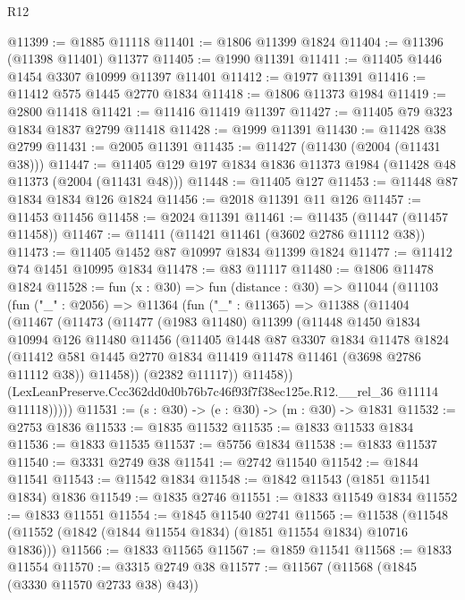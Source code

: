 \begin{lexlean}{R12}
\begin{coremodule}
@11399 := @1885 @11118
@11401 := @1806 @11399 @1824
@11404 := @11396 (@11398 @11401) @11377
@11405 := @1990 @11391
@11411 := @11405 @1446 @1454 @3307 @10999 @11397 @11401
@11412 := @1977 @11391
@11416 := @11412 @575 @1445 @2770 @1834
@11418 := @1806 @11373 @1984
@11419 := @2800 @11418
@11421 := @11416 @11419 @11397
@11427 := @11405 @79 @323 @1834 @1837 @2799 @11418
@11428 := @1999 @11391
@11430 := @11428 @38 @2799
@11431 := @2005 @11391
@11435 := @11427 (@11430 (@2004 (@11431 @38)))
@11447 := @11405 @129 @197 @1834 @1836 @11373 @1984 (@11428 @48 @11373 (@2004 (@11431 @48)))
@11448 := @11405 @127
@11453 := @11448 @87 @1834 @1834 @126 @1824
@11456 := @2018 @11391 @11 @126
@11457 := @11453 @11456
@11458 := @2024 @11391
@11461 := @11435 (@11447 (@11457 @11458))
@11467 := @11411 (@11421 @11461 (@3602 @2786 @11112 @38))
@11473 := @11405 @1452 @87 @10997 @1834 @11399 @1824
@11477 := @11412 @74 @1451 @10995 @1834
@11478 := @83 @11117
@11480 := @1806 @11478 @1824
@11528 := fun (x : @30) =>
  fun (distance : @30) =>
  @11044
    (@11103
      (fun ("_" : @2056) =>
      @11364
        (fun ("_" : @11365) =>
        @11388
          (@11404
            (@11467
              (@11473
                (@11477
                  (@1983 @11480)
                  @11399
                  (@11448
                    @1450
                    @1834
                    @10994
                    @126
                    @11480
                    @11456
                    (@11405
                      @1448
                      @87
                      @3307
                      @1834
                      @11478
                      @1824
                      (@11412 @581 @1445 @2770 @1834 @11419 @11478 @11461 (@3698 @2786 @11112 @38))
                      @11458))
                  (@2382 @11117))
                @11458))
            (LexLeanPreserve.Ccc362dd0d0b76b7c46f93f7f38ec125e.R12.__rel_36 @11114 @11118)))))
@11531 := (s : @30) -> (e : @30) -> (m : @30) -> @1831
@11532 := @2753 @1836
@11533 := @1835 @11532
@11535 := @1833 @11533 @1834
@11536 := @1833 @11535
@11537 := @5756 @1834
@11538 := @1833 @11537
@11540 := @3331 @2749 @38
@11541 := @2742 @11540
@11542 := @1844 @11541
@11543 := @11542 @1834
@11548 := @1842 @11543 (@1851 @11541 @1834) @1836
@11549 := @1835 @2746
@11551 := @1833 @11549 @1834
@11552 := @1833 @11551
@11554 := @1845 @11540 @2741
@11565 := @11538 (@11548 (@11552 (@1842 (@1844 @11554 @1834) (@1851 @11554 @1834) @10716 @1836)))
@11566 := @1833 @11565
@11567 := @1859 @11541
@11568 := @1833 @11554
@11570 := @3315 @2749 @38
@11577 := @11567 (@11568 (@1845 (@3330 @11570 @2733 @38) @43))

\end{coremodule}
\end{lexlean}
